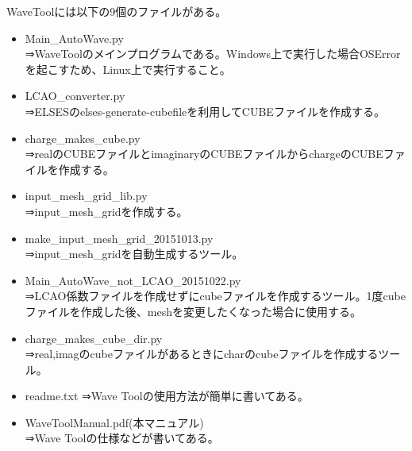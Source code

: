 \documentclass{jsarticle}
\begin{document}
WaveToolには以下の9個のファイルがある。\\
\begin{itemize}
\item Main\_AutoWave.py\\
⇒WaveToolのメインプログラムである。Windows上で実行した場合OSErrorを起こすため、Linux上で実行すること。\\

\item LCAO\_converter.py\\
⇒ELSESのelses-generate-cubefileを利用してCUBEファイルを作成する。\\

\item charge\_makes\_cube.py\\
⇒realのCUBEファイルとimaginaryのCUBEファイルからchargeのCUBEファイルを作成する。\\

\item input\_mesh\_grid\_lib.py\\
⇒input\_mesh\_gridを作成する。\\

\item make\_input\_mesh\_grid\_20151013.py\\
⇒input\_mesh\_gridを自動生成するツール。\\

\item Main\_AutoWave\_not\_LCAO\_20151022.py\\
⇒LCAO係数ファイルを作成せずにcubeファイルを作成するツール。1度cubeファイルを作成した後、meshを変更したくなった場合に使用する。\\

\item charge\_makes\_cube\_dir.py\\
⇒real,imagのcubeファイルがあるときにcharのcubeファイルを作成するツール。\\

\item readme.txt
⇒Wave Toolの使用方法が簡単に書いてある。\\

\item WaveToolManual.pdf(本マニュアル)\\
⇒Wave Toolの仕様などが書いてある。\\

\end{itemize}


\end{document}
